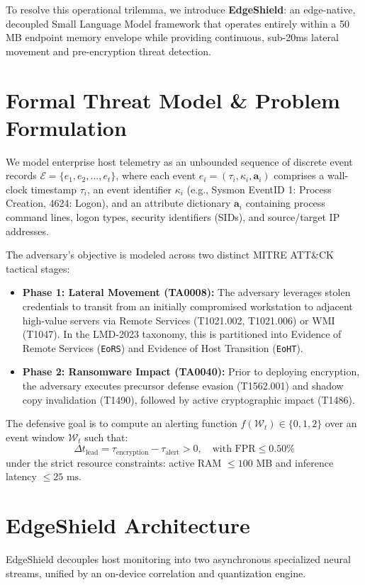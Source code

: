\documentclass[10pt,journal,compsoc]{IEEEtran}
\begin{document}
To resolve this operational trilemma, we introduce \textbf{EdgeShield}: an edge-native, decoupled Small Language Model framework that operates entirely within a 50 MB endpoint memory envelope while providing continuous, sub-20ms lateral movement and pre-encryption threat detection.

\section{Formal Threat Model \& Problem Formulation}
We model enterprise host telemetry as an unbounded sequence of discrete event records $\mathcal{E} = \{e_1, e_2, \dots, e_t\}$, where each event $e_i = (\tau_i, \kappa_i, \mathbf{a}_i)$ comprises a wall-clock timestamp $\tau_i$, an event identifier $\kappa_i$ (e.g., Sysmon EventID 1: Process Creation, 4624: Logon), and an attribute dictionary $\mathbf{a}_i$ containing process command lines, logon types, security identifiers (SIDs), and source/target IP addresses.

The adversary's objective is modeled across two distinct MITRE ATT\&CK tactical stages:
\begin{itemize}
    \item \textbf{Phase 1: Lateral Movement (TA0008):} The adversary leverages stolen credentials to transit from an initially compromised workstation to adjacent high-value servers via Remote Services (T1021.002, T1021.006) or WMI (T1047). In the LMD-2023 taxonomy, this is partitioned into Evidence of Remote Services (\texttt{EoRS}) and Evidence of Host Transition (\texttt{EoHT}).
    \item \textbf{Phase 2: Ransomware Impact (TA0040):} Prior to deploying encryption, the adversary executes precursor defense evasion (T1562.001) and shadow copy invalidation (T1490), followed by active cryptographic impact (T1486).
\end{itemize}

The defensive goal is to compute an alerting function $f(\mathcal{W}_t) \in \{0, 1, 2\}$ over an event window $\mathcal{W}_t$ such that:
\begin{equation}
    \Delta t_{\text{lead}} = \tau_{\text{encryption}} - \tau_{\text{alert}} > 0, \quad \text{with } \text{FPR} \le 0.50\%
\end{equation}
under the strict resource constraints: active RAM $\le 100\text{ MB}$ and inference latency $\le 25\text{ ms}$.

\section{EdgeShield Architecture}
EdgeShield decouples host monitoring into two asynchronous specialized neural streams, unified by an on-device correlation and quantization engine.
\end{document}
